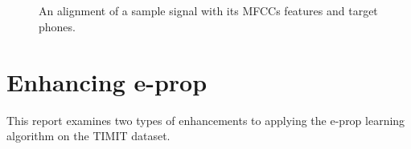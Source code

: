 			\begin{figure}[bth]
			    \myfloatalign
			     \\
			     \\
			    \caption[Input/features/targets]{An alignment of a sample signal with its MFCCs features and target phones.}\label{fig:source_mfcc_target}
			\end{figure}


\section{Enhancing e-prop}

	This report examines two types of enhancements to applying the e-prop learning algorithm on the TIMIT dataset.

